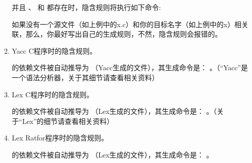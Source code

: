 \documentclass[a4paper,10pt]{sphinxmanual}
\begin{document}
\begin{enumerate}
\begin{sphinxVerbatim}[commandchars=\\\{\}]
   
\end{sphinxVerbatim}

并且  、  和  都存在时，隐含规则将执行如下命令:

\begin{sphinxVerbatim}[commandchars=\\\{\}]
    
    
    
     
  
  
  
\end{sphinxVerbatim}

如果没有一个源文件（如上例中的x.c）和你的目标名字（如上例中的x）相关联，那么，你最好写出自己的生成规则，不然，隐含规则会报错的。

\item {} 
Yacc C程序时的隐含规则。

 的依赖文件被自动推导为  （Yacc生成的文件），其生成命令是：  。（“Yacc”是一个语法分析器，关于其细节请查看相关资料）

\item {} 
Lex C程序时的隐含规则。

 的依赖文件被自动推导为  （Lex生成的文件），其生成命令是：  。（关于“Lex”的细节请查看相关资料）

\item {} 
Lex Ratfor程序时的隐含规则。

 的依赖文件被自动推导为  （Lex生成的文件），其生成命令是：  。


\end{enumerate}
\end{document}
